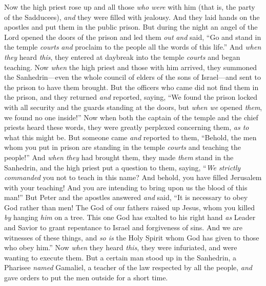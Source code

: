\begin{biblechapter}
 Now the high priest rose up and all those \textit{who were} with him (that is, the party of the Sadducees), \textit{and} they were filled with jealousy.
\verse And they laid hands on the apostles and put them in the public prison.
\verse But during the night an angel of the Lord opened the doors of the prison and led them \textit{out} \textit{and} said,
\verse “Go and stand in the temple \textit{courts} \textit{and} proclaim to the people all the words of this life.”
\verse And \textit{when they} heard \textit{this}, they entered at daybreak into the temple \textit{courts} and began teaching.
\verse Now \textit{when} the high priest and those with him arrived, they summoned the Sanhedrin—even the whole council of elders of the sons of Israel—and sent to the prison to have them brought.
\verse But the officers who came did not find them in the prison, and they returned \textit{and} reported,
\verse saying, “We found the prison locked with all security and the guards standing at the doors, but \textit{when we} opened \textit{them}, we found no one inside!”
\verse Now when both the captain of the temple and the chief priests heard these words, they were greatly perplexed concerning them, \textit{as to} what this might be.
\verse But someone came \textit{and} reported to them, “Behold, the men whom you put in prison are standing in the temple \textit{courts} and teaching the people!”
 And \textit{when they} had brought them, they made \textit{them} stand in the Sanhedrin, and the high priest put a question to them,
\verse saying, “\textit{We strictly commanded} you not to teach in this name? And behold, you have filled Jerusalem with your teaching! And you are intending to bring upon us the blood of this man!”
\verse But Peter and the apostles answered \textit{and} said, “It is necessary to obey God rather than men!
\verse The God of our fathers raised up Jesus, whom you killed \textit{by} hanging \textit{him} on a tree.
\verse This one God has exalted to his right hand \textit{as} Leader and Savior to grant repentance to Israel and forgiveness of sins.
\verse And we are witnesses of these things, and \textit{so is} the Holy Spirit whom God has given to those who obey him.”
\verse Now \textit{when} they heard \textit{this}, they were infuriated, and were wanting to execute them.
\verse But a certain man stood up in the Sanhedrin, a Pharisee \textit{named} Gamaliel, a teacher of the law respected by all the people, \textit{and} gave orders to put the men outside for a short time.

\end{biblechapter}
